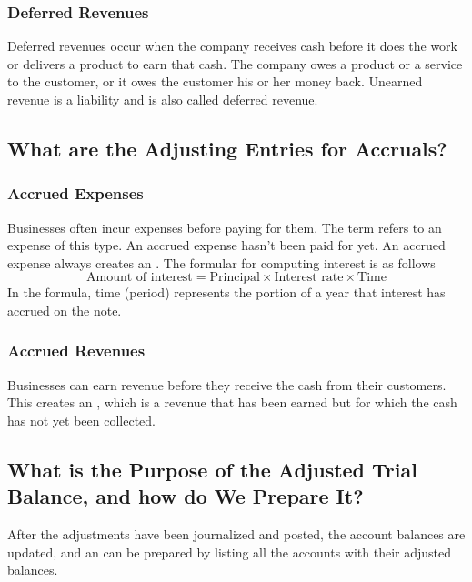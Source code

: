 \documentclass{article}
\begin{document}
\subsubsection{Deferred Revenues}

Deferred revenues occur when the company receives cash before it does the work or delivers a product to earn that cash. The company owes a product or a service to the customer, or it owes the customer his or her money back. Unearned revenue is a liability and is also called deferred revenue. 

\subsection{What are the Adjusting Entries for Accruals?}

\subsubsection{Accrued Expenses}

Businesses often incur expenses before paying for them. The term  refers to an expense of this type. An accrued expense hasn't been paid for yet. An accrued expense always creates an . The formular for computing interest is as follows $$\textrm{Amount of interest} = \textrm{Principal} \times \textrm{Interest rate} \times \textrm{Time}$$ In the formula, time (period) represents the portion of a year that interest has accrued on the note. 

\subsubsection{Accrued Revenues}

Businesses can earn revenue before they receive the cash from their customers. This creates an , which is a revenue that has been earned but for which the cash has not yet been collected. 

\subsection{What is the Purpose of the Adjusted Trial Balance, and how do We Prepare It?}

After the adjustments have been journalized and posted, the account balances are updated, and an  can be prepared by listing all the accounts with their adjusted balances. 
\end{document}
